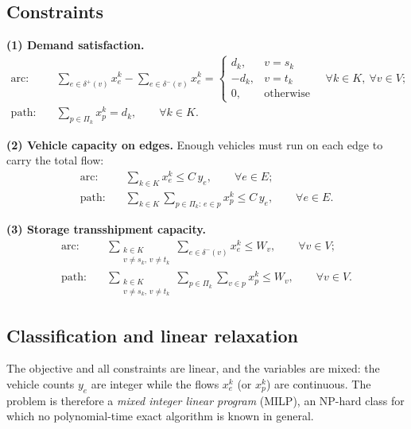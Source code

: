 \documentclass[runningheads]{llncs}
\newcommand{\E}{E}
\newcommand{\Vv}{V}
\begin{document}
\subsection{Constraints}
\textbf{(1) Demand satisfaction.}
\begin{align}
\text{arc:}\quad
&\sum_{e\in\delta^+(v)} x^k_e-\sum_{e\in\delta^-(v)} x^k_e=
 \begin{cases} d_k, & v=s_k\\ -d_k, & v=t_k\\ 0, & \text{otherwise}\end{cases}
 \quad \forall k\in K,\ \forall v\in \Vv;
 \label{eq:demand-arc}\\[2pt]
\text{path:}\quad
&\sum_{p\in\Pi_k} x^k_p=d_k, \qquad \forall k\in K.
\label{eq:demand-path}
\end{align}

\textbf{(2) Vehicle capacity on edges.} Enough vehicles must run on each edge
to carry the total flow:
\begin{align}
\text{arc:}\quad &\sum_{k\in K} x^k_e\le C\,y_e, \qquad \forall e\in \E;
\label{eq:cap-arc}\\
\text{path:}\quad &\sum_{k\in K}\sum_{p\in\Pi_k:\,e\in p} x^k_p\le C\,y_e,
\qquad \forall e\in \E.
\label{eq:cap-path}
\end{align}

\textbf{(3) Storage transshipment capacity.}
\begin{align}
\text{arc:}\quad
&\sum_{\substack{k\in K\\ v\neq s_k,\,v\neq t_k}}\sum_{e\in\delta^-(v)} x^k_e
 \le W_v, \qquad \forall v\in \Vv;
\label{eq:node-arc}\\
\text{path:}\quad
&\sum_{\substack{k\in K\\ v\neq s_k,\,v\neq t_k}}\sum_{p\in\Pi_k}
 \sum_{v\in p} x^k_p \le W_v, \qquad \forall v\in \Vv.
\label{eq:node-path}
\end{align}

\subsection{Classification and linear relaxation}
\label{sec:relax}
The objective and all constraints are linear, and the variables are mixed:
the vehicle counts $y_e$ are integer while the flows $x^k_e$ (or $x^k_p$) are
continuous. The problem is therefore a \emph{mixed integer linear program}
(MILP), an NP-hard class for which no polynomial-time exact algorithm is known
in general.
\end{document}

